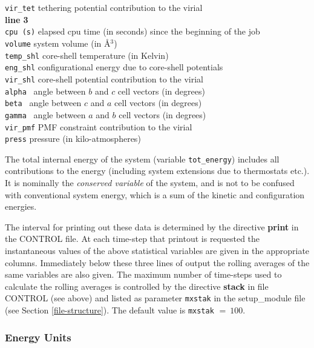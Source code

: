 \begin{tabbing}
\> {\tt vir\_tet}  \> tethering potential contribution to the virial \\
{\bf line 3} \\
\> {\tt cpu (s)}   \> elapsed cpu time (in seconds) since the beginning of the job \\
\> {\tt volume}    \> system volume (in \AA$^{3}$) \\
\> {\tt temp\_shl} \> core-shell temperature (in Kelvin) \\
\> {\tt eng\_shl}  \> configurational energy due to core-shell potentials \\
\> {\tt vir\_shl}  \> core-shell potential contribution to the virial \\
\> {\tt alpha }    \> angle between $b$ and $c$ cell vectors (in degrees) \\
\> {\tt beta }     \> angle between $c$ and $a$ cell vectors (in degrees) \\
\> {\tt gamma }    \> angle between $a$ and $b$ cell vectors (in degrees) \\
\> {\tt vir\_pmf}  \> PMF constraint contribution to the virial \\
\> {\tt press}     \> pressure (in kilo-atmospheres) \\
\end{tabbing}

 The total internal energy of the system
(variable {\tt tot\_energy}) includes all contributions to the
energy (including system extensions due to thermostats etc.).  It
is nominally the {\em conserved variable} of the system, and is
not to be confused with conventional system energy, which is a sum
of the kinetic and configuration energies.

The interval for printing out these data is determined by the
directive {\bf print} in the CONTROL file.  At each time-step that
printout is requested the instantaneous values of the above
statistical variables are given in the appropriate columns.
Immediately below these three lines of output the rolling averages
of the same variables are also given.  The maximum number of
time-steps used to calculate the rolling averages is controlled by
the directive {\bf stack} in file CONTROL (see above) and listed
as parameter {\tt mxstak} in the {\sc setup\_module} file (see
Section \ref{file-structure}).  The default value is {\tt mxstak}
$=~100$.

\subsubsection*{Energy Units}

